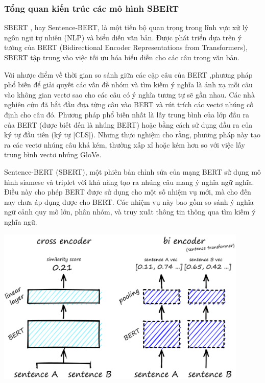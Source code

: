 \documentclass[a4paper, 12pt, openany]{book}
\begin{document}
\subsubsection{Tổng quan kiến trúc các mô hình SBERT}
SBERT , hay Sentence-BERT, là một tiến bộ quan trọng trong lĩnh vực xử lý ngôn ngữ tự nhiên (NLP) và biểu diễn văn bản. Được phát triển dựa trên ý tưởng của BERT (Bidirectional Encoder Representations from Transformers), SBERT tập trung vào việc tối ưu hóa biểu diễn cho các câu trong văn bản.

Với nhược điểm về thời gian so sánh giữa các cặp câu của BERT
,phương pháp phổ biến để giải quyết các vấn đề nhóm và tìm kiếm ý nghĩa là ánh xạ mỗi câu vào không gian vectơ sao cho các câu có ý nghĩa tương tự sẽ gần nhau. Các nhà nghiên cứu đã bắt đầu đưa từng câu vào BERT và rút trích các vectơ nhúng cố định cho câu đó. Phương pháp phổ biến nhất là lấy trung bình của lớp đầu ra của BERT (được biết đến là nhúng BERT) hoặc bằng cách sử dụng đầu ra của ký tự đầu tiên (ký tự [CLS]). Nhưng thực nghiệm cho rằng, phương pháp này tạo ra các vectơ nhúng câu khá kém, thường xấp xỉ hoặc kém hơn so với việc lấy trung bình vectơ nhúng GloVe.

Sentence-BERT (SBERT), một phiên bản chỉnh sửa của mạng BERT sử dụng mô hình siamese và triplet với khả năng tạo ra nhúng câu mang ý nghĩa ngữ nghĩa. Điều này cho phép BERT được sử dụng cho một số nhiệm vụ mới, mà cho đến nay chưa áp dụng được cho BERT. Các nhiệm vụ này bao gồm so sánh ý nghĩa ngữ cảnh quy mô lớn, phân nhóm, và truy xuất thông tin thông qua tìm kiếm ý nghĩa ngữ.

\begin{minipage}{\linewidth}
    \captionsetup{type=figure}
    \centering
    \includegraphics[width=12cm]{./assets/images/sbert1.jpg}
\end{minipage}
\end{document}
